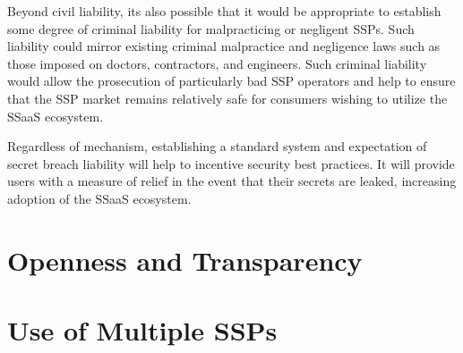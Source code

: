 Beyond civil liability, its also possible that it would be appropriate
to establish some degree of criminal liability for malpracticing or
negligent SSPs. Such liability could mirror existing criminal
malpractice and negligence laws such as those imposed on doctors,
contractors, and engineers. Such criminal liability would allow the
prosecution of particularly bad SSP operators and help to ensure that
the SSP market remains relatively safe for consumers wishing to
utilize the SSaaS ecosystem.

Regardless of mechanism, establishing a standard system and
expectation of secret breach liability will help to incentive security
best practices. It will provide users with a measure of relief in the
event that their secrets are leaked, increasing adoption of the SSaaS
ecosystem.

\section{Openness and Transparency}

\section{Use of Multiple SSPs}

